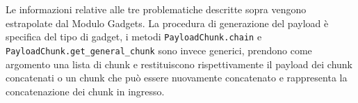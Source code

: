 Le informazioni relative alle tre problematiche descritte sopra
vengono estrapolate dal Modulo Gadgets. La procedura di generazione del
payload è specifica del tipo di gadget, i metodi
\lstinline{PayloadChunk.chain} e
\lstinline{PayloadChunk.get_general_chunk} sono invece generici,
prendono come argomento una lista di chunk e restituiscono
rispettivamente il payload dei chunk concatenati o un chunk che può
essere nuovamente concatenato e rappresenta la concatenazione dei
chunk in ingresso.



